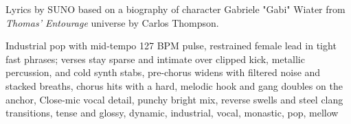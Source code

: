 
\begin{notes}
Lyrics by SUNO based on a biography of character Gabriele "Gabi" Wiater from \emph{Thomas’ Entourage} universe by Carlos Thompson.
\end{notes}
\begin{style}
Industrial pop with mid-tempo 127 BPM pulse, restrained female lead in tight fast phrases; verses stay sparse and intimate over clipped kick, metallic percussion, and cold synth stabs, pre-chorus widens with filtered noise and stacked breaths, chorus hits with a hard, melodic hook and gang doubles on the anchor, Close-mic vocal detail, punchy bright mix, reverse swells and steel clang transitions, tense and glossy, dynamic, industrial, vocal, monastic, pop, mellow
\end{style}
